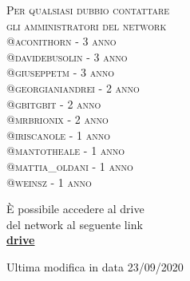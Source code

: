 \documentclass[a4paper, 11pt, oneside, article]{book} %
\begin{document}
\begin{titlepage}
	{  \scshape 
		Per qualsiasi dubbio contattare\\ 
		gli amministratori del network \break \\ 
		@aconithorn - 3\textordmasculine \hspace{0.01cm} anno\\
		@davidebusolin - 3\textordmasculine \hspace{0.01cm} anno\\
		@giuseppetm - 3\textordmasculine \hspace{0.01cm} anno\\ 
		@georgianiandrei - 2\textordmasculine \hspace{0.01cm} anno\\
		@gbitgbit - 2\textordmasculine \hspace{0.01cm} anno\\
		@mrbrionix - 2\textordmasculine \hspace{0.01cm} anno\\
		@iriscanole - 1\textordmasculine \hspace{0.01cm} anno\\
		@mantotheale - 1\textordmasculine \hspace{0.01cm} anno\\
		@mattia\_oldani - 1\textordmasculine \hspace{0.01cm} anno\\
		@weinsz - 1\textordmasculine \hspace{0.01cm} anno\\
		} %
	
	\vspace{3\baselineskip} %
	
	È possibile accedere al drive \\del network al seguente link\\
	\textbf{\href{https://drive.google.com/drive/folders/0BwzuyD3iLGcbcUNxTVNOVE9FR1E}{drive}}
	
	
	\vfill %
	
	
	{\large Ultima modifica in data 23/09/2020} 

\end{titlepage}
\end{document}
